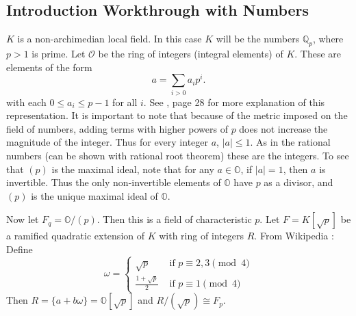 \begin{center}
\section*{Introduction Workthrough with \padic Numbers}
\end{center}
$K$ is a non-archimedian local field. In this case $K$ will be the \padic numbers $\mathbb{Q}_p$, where $p > 1$ is prime.
Let 	$\mathcal{O}$ be the ring of integers (integral elements) of $K$. These are elements of the form
\[
a = \sum_{i > 0}a_i p^i.
\]
with each $0 \le a_i \le p - 1$ for all $i$. See \cite{katok}, page 28 for more explanation of this representation.
It is important to note that because of the metric imposed on the field of \padic numbers, adding terms with higher powers of $p$ does not increase the magnitude of the integer.
Thus for every \padic integer $a$, $|a| \le 1$.
As in the rational numbers (can be shown with rational root theorem) these are the integers.
To see that $(p)$ is the maximal ideal, note that for any $a \in \mathbb{O}$, if $|a| = 1$, then $a$ is invertible.
Thus the only non-invertible elements of $\mathbb{O}$ have $p$ as a divisor, and $(p)$ is the unique maximal ideal of $\mathbb{O}$.

Now let $F_q = \mathbb{O}/(p)$. Then this is a field of characteristic $p$.
Let $F = K[\sqrt{p}]$ be a ramified quadratic extension of $K$ with ring of integers $R$.
From Wikipedia \cite{wikipedia:quadratic-integer}: Define
\[
\omega = \begin{cases}
\sqrt{p} &\text{ if } p \equiv 2,3 \pmod{4}\\
\frac{1 + \sqrt{p}}{2} &\text{ if } p \equiv 1 \pmod{4}
\end{cases}
\]
Then $R = \{a + b \omega \} = \mathbb{O}[\sqrt{p}]$ and $R/(\sqrt{p}) \cong F_p$.
